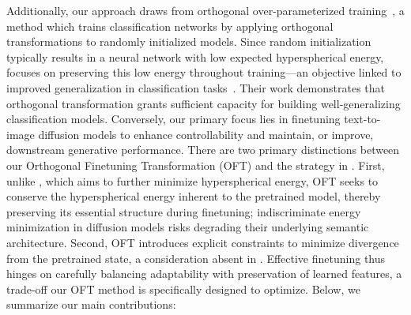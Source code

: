 Additionally, our approach draws from orthogonal over-parameterized training~\cite{liu2021orthogonal}, a method which trains classification networks by applying orthogonal transformations to randomly initialized models. Since random initialization typically results in a neural network with low expected hyperspherical energy, \cite{liu2021orthogonal} focuses on preserving this low energy throughout training—an objective linked to improved generalization in classification tasks~\cite{liu2018learning,lin2020regularizing}. Their work demonstrates that orthogonal transformation grants sufficient capacity for building well-generalizing classification models. Conversely, our primary focus lies in finetuning text-to-image diffusion models to enhance controllability and maintain, or improve, downstream generative performance. There are two primary distinctions between our Orthogonal Finetuning Transformation (OFT) and the strategy in \cite{liu2021orthogonal}. First, unlike \cite{liu2021orthogonal}, which aims to further minimize hyperspherical energy, OFT seeks to conserve the hyperspherical energy inherent to the pretrained model, thereby preserving its essential structure during finetuning; indiscriminate energy minimization in diffusion models risks degrading their underlying semantic architecture. Second, OFT introduces explicit constraints to minimize divergence from the pretrained state, a consideration absent in \cite{liu2021orthogonal}. Effective finetuning thus hinges on carefully balancing adaptability with preservation of learned features, a trade-off our OFT method is specifically designed to optimize. Below, we summarize our main contributions:

